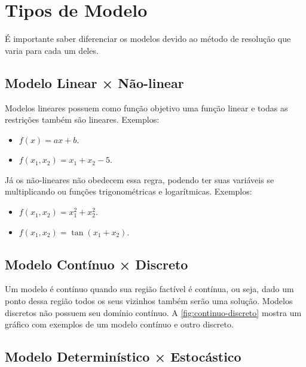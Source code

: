 \section{Tipos de Modelo}\label{sec:tipos-de-modelo}

É importante saber diferenciar os modelos devido ao método de resolução que varia para cada um deles.

\subsection{Modelo Linear × Não-linear}\label{subsec:modelo-linear}


Modelos lineares possuem como função objetivo uma função linear e todas as restrições também são lineares.
Exemplos:

\begin{itemize}
    \item $f(x) = ax + b$.
    \item $f(x_1, x_2) = x_1 + x_2 - 5$.
\end{itemize}

Já os não-lineares não obedecem essa regra, podendo ter suas variáveis se multiplicando ou funções trigonométricas e logarítmicas.
Exemplos:

\begin{itemize}
    \item $f(x_1, x_2) = x_1^2 + x_2^2$.
    \item $f(x_1, x_2) = \tan(x_1 + x_2)$.
\end{itemize}



\subsection{Modelo Contínuo × Discreto}\label{subsec:modelo-continuo-x-discreto}

Um modelo é contínuo quando sua região factível é contínua, ou seja, dado um ponto dessa região todos os seus vizinhos também serão uma solução.
Modelos discretos não possuem seu domínio contínuo.
A \autoref{fig:continuo-discreto} mostra um gráfico com exemplos de um modelo contínuo e outro discreto.



\subsection{Modelo Determinístico × Estocástico}\label{subsec:modelo-deterministico-x-estocastico}

